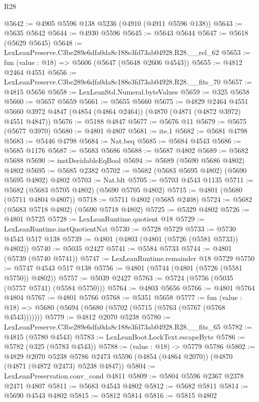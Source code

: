 \begin{lexlean}{R28}
\begin{coremodule}
@5642 := @4905 @5596 @138 @5236 (@4910 (@4911 @5596 @138))
@5643 := @5635 @5642
@5644 := @4930 @5596
@5645 := @5643 @5644
@5647 := @5618 (@5629 @5645)
@5648 := LexLeanPreserve.C3be289e6dfa0da8c188e3fd73ab04928.R28.__rel_62
@5653 := fun (value : @18) => @5606 (@5647 (@5648 @2606 @4543))
@5655 := @4812 @2464 @4551
@5656 := LexLeanPreserve.C3be289e6dfa0da8c188e3fd73ab04928.R28.__fits_70
@5657 := @4815 @5656
@5658 := LexLeanStd.Numeral.byteValues
@5659 := @325 @5658
@5660 := @5657 @5659
@5661 := @5655 @5660
@5675 := @4829
    @2464
    @4551
    @5660
    @3972
    @4847
    (@4854 (@4864 @2464))
    (@4870 (@4871 (@4872 @3972) @4551 @4847))
@5676 := @5188 @4847
@5677 := @5676 @11
@5679 := @5675 (@5677 @3970)
@5680 := @4801 @4807
@5681 := ite.{1}
@5682 := @5681 @4798
@5683 := @5446 @4798
@5684 := Nat.beq
@5685 := @5684 @4543
@5686 := @5685 @1176
@5687 := @5683 @5686
@5688 := @5687 @4802
@5689 := @5682 @5688
@5690 := instDecidableEqBool
@5694 := @5689 (@5690 @5686 @4802) @4802
@5695 := @5685 @2382
@5702 := @5682 (@5683 @5695 @4802) (@5690 @5695 @4802) @4802
@5703 := Nat.blt
@5705 := @5703 @4543 @1135
@5711 := @5682 (@5683 @5705 @4802) (@5690 @5705 @4802)
@5715 := @4801 (@5680 (@5711 @4804 @4807))
@5718 := @5711 @4802 (@5685 @2408)
@5724 := @5682 (@5683 @5718 @4802) (@5690 @5718 @4802)
@5725 := @5329 @4802
@5726 := @4801 @5725
@5728 := LexLeanRuntime.quotient @18
@5729 := LexLeanRuntime.instQuotientNat
@5730 := @5728 @5729
@5733 := @5730 @4543 @517 @138
@5739 := @4801 (@4803 (@4801 (@5726 (@5581 @5733)) @4802))
@5740 := @5035 @2427
@5741 := @5584 @5733
@5744 := @4801 (@5739 (@5740 @5741))
@5747 := LexLeanRuntime.remainder @18 @5729
@5750 := @5747 @4543 @517 @138
@5756 := @4801 (@5744 (@4801 (@5726 (@5581 @5750)) @4802))
@5757 := @5039 @2427
@5763 := @5724 (@5756 (@5035 (@5757 @5741) (@5584 @5750)))
@5764 := @4803 @5656
@5766 := @4801 @5764 @4804
@5767 := @4801 @5766
@5768 := @5351 @5658
@5777 := fun (value : @18) => @5680 (@5694 (@5680 (@5702 (@5715 (@5763 (@5767 (@5768 @4543)))))))
@5779 := @4812 @2070 @5238
@5780 := LexLeanPreserve.C3be289e6dfa0da8c188e3fd73ab04928.R28.__fits_65
@5782 := @4815 (@5780 @4543)
@5783 := LexLeanBoot.LockText.escapeByte
@5786 := @5782 (@325 (@5783 @4543))
@5788 := (value : @18) -> @5779 @5786
@5802 := @4829
    @2070
    @5238
    @5786
    @2473
    @5596
    (@4854 (@4864 @2070))
    (@4870 (@4871 (@4872 @2473) @5238 @4847))
@5804 := LexLeanPreservation.conv_cond @4811
@5809 := @5804 @5596 @2367 @2378 @2471 @4807
@5811 := @5683 @4543 @4802
@5812 := @5682 @5811
@5814 := @5690 @4543 @4802
@5815 := @5812 @5814
@5816 := @5815 @4802

\end{coremodule}
\end{lexlean}
